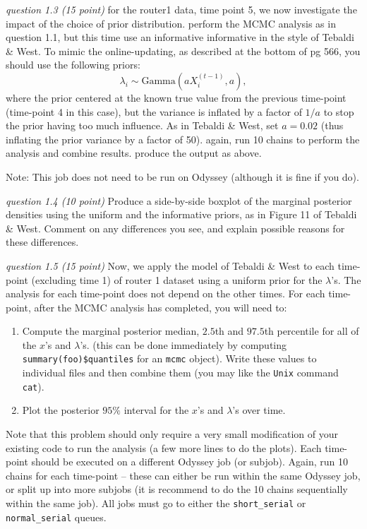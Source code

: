 \documentclass[11pt]{article}
\begin{document}
{\em question 1.3 (15 point)} 
%
for the router1 data, time point 5, we now investigate the impact of the choice of prior distribution. perform the MCMC analysis as in question 1.1, but this time use an informative informative in the style of Tebaldi \& West. To mimic the online-updating, as described at the bottom of pg 566, you should use the following priors:
\begin{equation}\label{prior}
\lambda_{i} \sim \textrm{Gamma}\left(aX_{i}^{(t-1)},a\right) ,
\end{equation}
where the prior centered at the known true value from the previous time-point (time-point 4 in this case), but the variance is inflated by a factor of $1/a$ to stop the prior having too much influence. As in Tebaldi \& West, set $a=0.02$ (thus inflating the prior variance by a factor of 50). again, run 10 chains to perform the analysis and combine results. produce the output as above.

Note: This job does not need to be run on Odyssey (although it is fine if you do).  

{\em question 1.4 (10 point)}
%
Produce a side-by-side boxplot of the marginal posterior densities using the uniform and the informative priors, as in Figure 11 of Tebaldi \& West. Comment on any differences you see, and explain possible reasons for these differences.

{\em question 1.5 (15 point)} 
%
Now, we apply the model of Tebaldi \& West to each time-point (excluding time 1) of router 1 dataset using a uniform prior for the $\lambda$'s. The analysis for each time-point does not depend on the other times. For each time-point, after the MCMC analysis has completed, you will need to:
\begin{enumerate}
\item Compute the marginal posterior median, $2.5$th and $97.5$th percentile for all of the $x$'s and $\lambda$'s. (this can be done immediately by computing \texttt{summary(foo)\$quantiles} for an \texttt{mcmc} object). Write these values to individual files and then combine them (you may like the \texttt{Unix} command \texttt{cat}). 
\item Plot the posterior $95\%$ interval for the $x$'s and $\lambda$'s over time.
\end{enumerate}
Note that this problem should only require a very small modification of your existing code to run the analysis (a few more lines to do the plots). Each time-point should be executed on a different Odyssey job (or subjob). Again, run 10 chains for each time-point -- these can either be run within the same Odyssey job, or split up into more subjobs (it is recommend to do the 10 chains sequentially within the same job). All jobs must go to either the \texttt{short\_serial} or \texttt{normal\_serial} queues.
\end{document}

